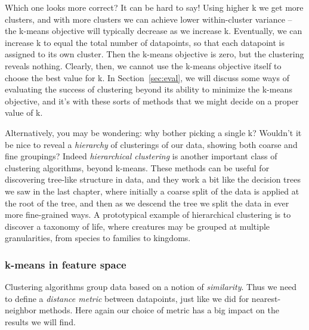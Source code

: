 \documentclass[11pt]{article}
\begin{document}
Which one looks more correct? It can be hard to say! Using higher k we get more clusters, and with more clusters we can achieve lower within-cluster variance -- the k-means objective will typically decrease as we increase k. Eventually, we can increase k to equal the total number of datapoints, so that each datapoint is assigned to its own cluster. Then the k-means objective is zero, but the clustering reveals nothing. 
Clearly, then, we cannot use the k-means objective itself to choose the best value for k. In Section~\ref{sec:eval}, we will discuss some ways of evaluating the success of clustering beyond its ability to minimize the k-means objective, and it's with these sorts of methods that we might decide on a proper value of k.

Alternatively, you may be wondering: why bother picking a single k? Wouldn't it be nice to reveal a \textit{hierarchy} of clusterings of our data, showing both coarse and fine groupings? Indeed \textit{hierarchical clustering} is another important class of clustering algorithms, beyond k-means. These methods can be useful for discovering tree-like structure in data, and they work a bit like the decision trees we saw in the last chapter, where initially a coarse split of the data is applied at the root of the tree, and then as we descend the tree we split the data in ever more fine-grained ways. A prototypical example of hierarchical clustering is to discover a taxonomy of life, where creatures may be grouped at multiple granularities, from species to families to kingdoms. 




\subsubsection{k-means in feature space}
Clustering algorithms group data based on a notion of \textit{similarity}. Thus we need to define a \textit{distance metric} between datapoints, just like we did for nearest-neighbor methods. Here again our choice of metric has a big impact on the results we will find.
\end{document}
